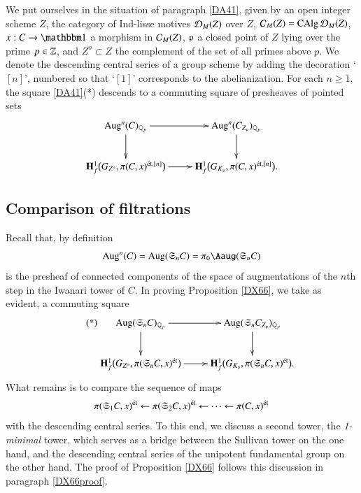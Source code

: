 \begin{ssProposition}
\label{DX66}
We put ourselves in the situation of paragraph \ref{DA41}, given by an open integer scheme $Z$, the category of Ind-lisse motives $\mathcal{D}_M(Z)$ over $Z$, $\mathcal{C}_M(Z) = \operatorname{CAlg} \mathcal{D}_M(Z)$, $x: C \to \one$ a morphism in $\mathcal{C}_M(Z)$, $\mathfrak{p}$ a closed point of $Z$ lying over the prime $p \in \mathbb{Z}$, and $Z^o \subset Z$ the complement of the set of all primes above $p$. We denote the descending central series of a group scheme by adding the decoration `$[n]$', numbered so that `$[1]$' corresponds to the abelianization. For each $n \ge 1$, the square \ref{DA41}(*) descends to a commuting square of presheaves of pointed sets
\[
\xymatrix{
\Aug^n(C)_\Qp \ar[r] \ar[d] & \Aug^n(C_{Z_\pP})_\Qp \ar[d]
\\
\mathbf{H}^1_f \big( 
G_{Z^o}, \pi(C,x)^{\et, [n]}
\big)
\ar[r]
&
\mathbf{H}^1_f \big( 
G_{K_\pP}, \pi(C,x)^{\et, [n]}
\big).
}
\]
\end{ssProposition}

\subsection{Comparison of filtrations}
\label{Sec:CompFil}
\label{XX66}
Recall that, by definition 
\[
\Aug^n(C) = \Aug(\fkS_nC) = \pi_0 \Aaug(\fkS_n C)
\]
is the presheaf of connected components of the space of augmentations of the $n$th step in the Iwanari tower of $C$. In proving Proposition \ref{DX66}, we take as evident, a commuting square
\[
\tag{*}
\xymatrix{
\Aug(\fkS_nC)_\Qp \ar[r] \ar[d] & \Aug(\fkS_nC_{Z_\pP})_\Qp \ar[d]
\\
\mathbf{H}^1_f \big( 
G_{Z^o}, \pi(\fkS_nC,x)^{\et}
\big)
\ar[r]
&
\mathbf{H}^1_f \big( 
G_{K_\pP}, \pi(\fkS_nC,x)^{\et}
\big).
}
\] 
What remains is to compare the sequence of maps
\[
\pi(\mathfrak{S}_1C,x)^{{\textrm {\'et}}}
\leftarrow
\pi(\mathfrak{S}_2C,x)^{{\textrm {\'et}}} 
\leftarrow 
\cdots
\leftarrow
\pi(C,x)^{{\textrm {\'et}}}
\]
with the descending central series. To this end, we discuss a second tower, the \emph{1-minimal} tower, which serves as a bridge between the Sullivan tower on the one hand, and the descending central series of the unipotent fundamental group on the other hand. The proof of Proposition \ref{DX66} follows this discussion in paragraph \ref{DX66proof}.


